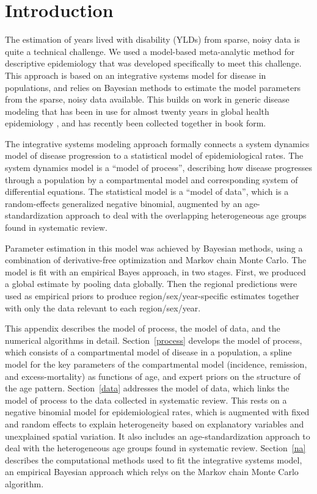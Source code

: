 \documentclass[12pt]{article}
\newcommand{\1}{\mathbf{1}}
\newcommand{\0}{\mathbf{0}}
\begin{document}
\section{Introduction}
The estimation of years lived with disability (YLDs) from sparse,
noisy data is quite a technical challenge.  We used a model-based
meta-analytic method for descriptive epidemiology that was developed
specifically to meet this challenge.  This approach is based on an
integrative systems model for disease in populations, and relies on
Bayesian methods to estimate the model parameters from the sparse,
noisy data available.  This builds on work in generic disease modeling
that has been in use for almost twenty years in global health
epidemiology \cite{Barendregt_Generic_2003}, and has recently been
collected together in book form.

The integrative systems modeling approach formally connects a system
dynamics model of disease progression to a statistical model of
epidemiological rates.  The system dynamics model is a ``model of
process'', describing how disease progresses through a population by a
compartmental model and corresponding system of differential
equations.  The statistical model is a ``model of data'', which is a
random-effects generalized negative binomial, augmented by an
age-standardization approach to deal with the overlapping
heterogeneous age groups found in systematic review.

Parameter estimation in this model was achieved by Bayesian methods,
using a combination of derivative-free optimization and Markov chain
Monte Carlo.  The model is fit with an empirical Bayes approach, in
two stages.  First, we produced a global estimate by pooling data
globally.  Then the regional predictions were used as empirical priors
to produce region/sex/year-specific estimates together with only the
data relevant to each region/sex/year.

This appendix describes the model of process, the model of data, and
the numerical algorithms in detail.  Section~\ref{process} develops
the model of process, which consists of a compartmental model of
disease in a population, a spline model for the key parameters of the
compartmental model (incidence, remission, and excess-mortality) as
functions of age, and expert priors on the structure of the age
pattern.  Section~\ref{data} addresses the model of data, which links
the model of process to the data collected in systematic review.  This
rests on a negative binomial model for epidemiological rates, which is
augmented with fixed and random effects to explain heterogeneity based
on explanatory variables and unexplained spatial variation.  It also
includes an age-standardization approach to deal with the
heterogeneous age groups found in systematic review.  Section~\ref{na}
describes the computational methods used to fit the integrative
systems model, an empirical Bayesian approach which relys on the
Markov chain Monte Carlo algorithm.
\end{document}

